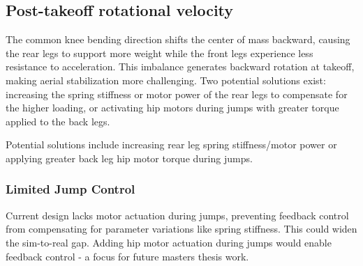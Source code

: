 \subsection{Post-takeoff rotational velocity}
The common knee bending direction shifts the center of mass backward, causing the rear legs to support more weight while the front legs 
experience less resistance to acceleration. This imbalance generates backward rotation at takeoff, making aerial stabilization more 
challenging. Two potential solutions exist: increasing the spring stiffness or motor power of the rear legs to compensate for the higher 
loading, or activating hip motors during jumps with greater torque applied to the back legs.

Potential solutions include increasing rear leg spring stiffness/motor power or applying greater back leg hip motor torque during jumps.

\subsubsection{Limited Jump Control}
Current design lacks motor actuation during jumps, preventing feedback control from compensating for parameter variations like spring stiffness. This could widen the sim-to-real gap. Adding hip motor actuation during jumps would enable feedback control - a focus for future masters thesis work.

